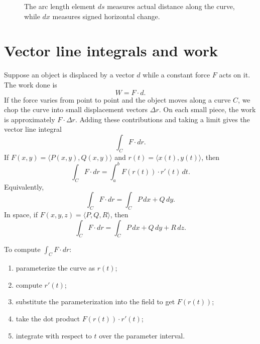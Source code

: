 \documentclass[11pt,oneside]{book}
\newcommand{\norm}[1]{\left\lVert #1\right\rVert}
\begin{document}
\begin{figure}[H]
\centering
{}
\caption{The arc length element $ds$ measures actual distance along the curve, while $dx$ measures signed horizontal change.}
\end{figure}

\section{Vector line integrals and work}

Suppose an object is displaced by a vector $d$ while a constant force $F$ acts on it. The work done is
\[
W=F\cdot d.
\]
If the force varies from point to point and the object moves along a curve $C$, we chop the curve into small displacement vectors $\Delta r$. On each small piece, the work is approximately $F\cdot \Delta r$. Adding these contributions and taking a limit gives the vector line integral
\[
\int_C F\cdot dr.
\]
If $F(x,y)=\langle P(x,y),Q(x,y)\rangle$ and $r(t)=\langle x(t),y(t)\rangle$, then
\[
\int_C F\cdot dr=\int_a^b F(r(t))\cdot r'(t)\,dt.
\]
Equivalently,
\[
\int_C F\cdot dr=\int_C P\,dx+Q\,dy.
\]
In space, if $F(x,y,z)=\langle P,Q,R\rangle$, then
\[
\int_C F\cdot dr=\int_C P\,dx+Q\,dy+R\,dz.
\]

\begin{mainideabox}
To compute $\int_C F\cdot dr$:
\begin{enumerate}
  \item parameterize the curve as $r(t)$;
  \item compute $r'(t)$;
  \item substitute the parameterization into the field to get $F(r(t))$;
  \item take the dot product $F(r(t))\cdot r'(t)$;
  \item integrate with respect to $t$ over the parameter interval.
\end{enumerate}
\end{mainideabox}
\end{document}
